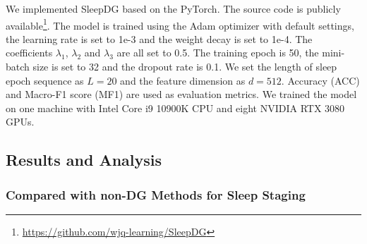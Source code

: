 \documentclass[letterpaper]{article} %
\begin{document}
	We implemented SleepDG based on the PyTorch.
	The source code is publicly available\footnote{\url{https://github.com/wjq-learning/SleepDG}}.
	The model is trained using the Adam optimizer with default settings, the learning rate is set to 1e-3 and the weight decay is set to 1e-4.
	The coefficients $\lambda_1$, $\lambda_2$ and $\lambda_3$ are all set to 0.5.
	The training epoch is 50, the mini-batch size is set to 32 and the dropout rate is 0.1.
	We set the length of sleep epoch sequence as $L=20$ and the feature dimension as $d=512$.
	Accuracy (ACC) and Macro-F1 score (MF1) are used as evaluation metrics.
	We trained the model on one machine with Intel Core i9 10900K CPU and eight NVIDIA RTX 3080 GPUs.

	\subsection{Results and Analysis}

	\subsubsection{Compared with non-DG Methods for Sleep Staging}
\end{document}
